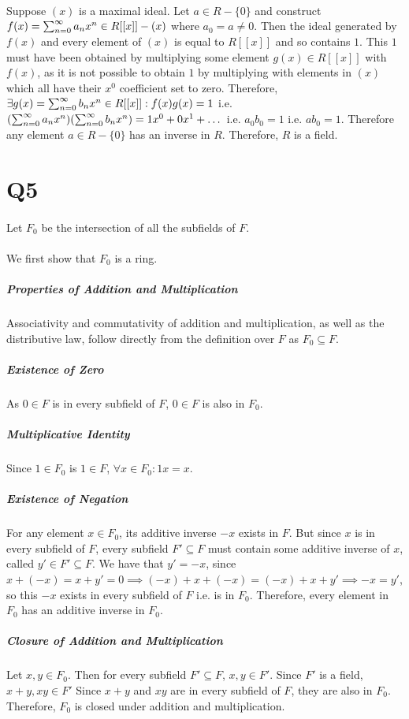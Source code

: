 \documentclass[]{article}
\begin{document}
	\paragraph{}
	Suppose $(x)$ is a maximal ideal.\newline
	Let $a \in R-\{0\}$ and construct $f(x) = \sum_{n = 0}^{\infty} a_nx^n \in R[[x]]-(x)$ where $a_0 = a \not= 0$.\newline
	Then the ideal generated by $f(x)$ and every element of $(x)$ is equal to $R[[x]]$ and so contains $1$.\newline
	This $1$ must have been obtained by multiplying some element $g(x) \in R[[x]]$ with $f(x)$, as it is not possible to obtain $1$ by multiplying with elements in $(x)$ which all have their $x^0$ coefficient set to zero.\newline
	Therefore, $\exists g(x) = \sum_{n = 0}^{\infty} b_nx^n \in R[[x]]: f(x)g(x) = 1$ i.e. $(\sum_{n = 0}^{\infty} a_nx^n)(\sum_{n = 0}^{\infty} b_nx^n) = 1x^0 + 0x^1 + \dots$ i.e. $a_0b_0 = 1$ i.e. $ab_0 = 1$.\newline
	Therefore any element $a \in R-\{0\}$ has an inverse in $R$.\newline
	Therefore, $R$ is a field.\newline\newline


\section*{Q5}
	\paragraph{}
	Let $F_0$ be the intersection of all the subfields of $F$.
	
	\paragraph{}
	We first show that $F_0$ is a ring.
	\subparagraph{Properties of Addition and Multiplication} Associativity and commutativity of addition and multiplication, as well as the distributive law, follow directly from the definition over $F$ as $F_0 \subseteq F$.
	\subparagraph{Existence of Zero} As $0 \in F$ is in every subfield of $F$, $0 \in F$ is also in $F_0$.
	\subparagraph{Multiplicative Identity} Since $1 \in F_0$ is $1 \in F$, $\forall x \in F_0: 1x = x$.
	\subparagraph{Existence of Negation}For any element $x \in F_0$, its additive inverse $-x$ exists in $F$. But since $x$ is in every subfield of $F$, every subfield $F' \subseteq F$ must contain some additive inverse of $x$, called $y' \in F' \subseteq F$.  We have that $y' = -x$, since $x + (-x) = x + y' = 0 \implies (-x) + x + (-x) = (-x) + x + y' \implies -x = y'$, so this $-x$ exists in every subfield of $F$ i.e. is in $F_0$. Therefore, every element in $F_0$ has an additive inverse in $F_0$.
	\subparagraph{Closure of Addition and Multiplication} Let $x, y \in F_0$. Then for every subfield $F' \subseteq F$, $x, y \in F'$. Since $F'$ is a field, $x+y, xy \in F'$  Since $x+y$ and $xy$ are in every subfield of $F$, they are also in $F_0$. Therefore, $F_0$ is closed under addition and multiplication.
	
\end{document}
